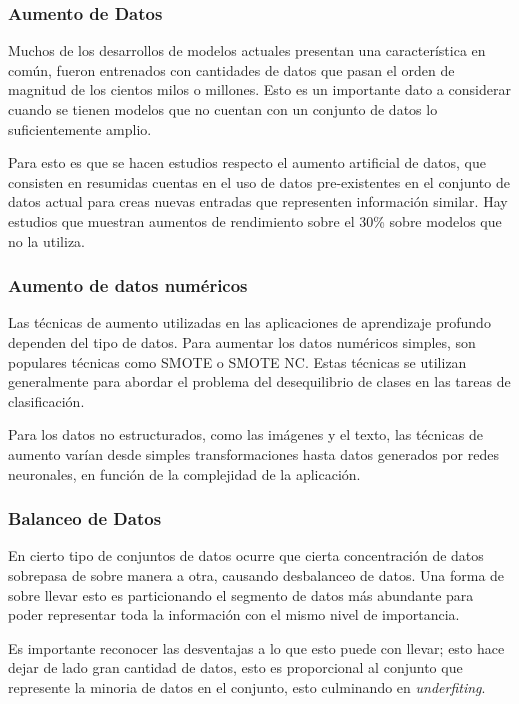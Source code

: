 \documentclass[letter,12pt]{report}
\begin{document}
\subsubsection{Aumento de Datos}
Muchos de los desarrollos de modelos actuales presentan una característica en común,
fueron entrenados con cantidades de datos que pasan el orden de magnitud de los cientos
milos o millones. Esto es un importante dato a considerar cuando se tienen modelos que
no cuentan con un conjunto de datos lo suficientemente amplio.

Para esto es que se hacen estudios respecto el aumento artificial de datos, que consisten
en resumidas cuentas en el uso de datos pre-existentes en el conjunto de datos actual
para creas nuevas entradas que representen información similar. Hay estudios que muestran
aumentos de rendimiento sobre el 30\%\cite{Augment} sobre modelos que no la utiliza.

\subsubsection{Aumento de datos numéricos}
Las técnicas de aumento utilizadas\cite{Augment2} en las aplicaciones de aprendizaje
profundo dependen del tipo de datos. Para aumentar los datos numéricos simples, son
populares técnicas como SMOTE o SMOTE NC. Estas técnicas se utilizan generalmente para
abordar el problema del desequilibrio de clases en las tareas de clasificación. 

Para los datos no estructurados, como las imágenes y el texto, las técnicas de aumento
varían desde simples transformaciones hasta datos generados por redes neuronales, en
función de la complejidad de la aplicación\cite{Augment3}.

\subsubsection{Balanceo de Datos}

En cierto tipo de conjuntos de datos ocurre que cierta concentración de datos sobrepasa
de sobre manera a otra, causando desbalanceo de datos. Una forma de sobre llevar esto es
particionando el segmento de datos más abundante para poder representar toda la
información con el mismo nivel de importancia.

Es importante reconocer las desventajas a lo que esto puede con llevar; esto hace dejar
de lado gran cantidad de datos, esto es proporcional al conjunto que represente la
minoria de datos en el conjunto, esto culminando en \textit{underfiting}.
\end{document}
